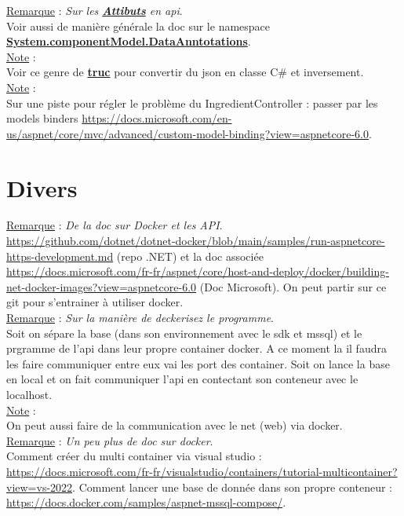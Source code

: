 \documentclass[a4paper,12pt,twoside]{article}
\newcommand{\urlcolor}{magenta}  %
\newcommand{\keycolor}{purple} %
\newcommand{\rem}[2]{\noindent\underline{Remarque} : \textit{#1}.\\ \indent #2}
\newcommand{\note}[1]{\noindent\underline{Note} : \\ \indent #1}
\newcommand{\keyref}[2]{\hypersetup{urlcolor=\keycolor} \href{#1}{\textbf{#2}}\hypersetup{urlcolor=\urlcolor}}
\begin{document}
\rem{Sur les \keyref{https://docs.microsoft.com/fr-fr/dotnet/api/system.componentmodel.dataannotations.metadatatypeattribute?view=net-6.0}{Attibuts} en api}{Voir aussi de manière générale la doc sur le namespace \keyref{https://docs.microsoft.com/fr-fr/dotnet/api/system.componentmodel.dataannotations?view=net-6.0}{System.componentModel.DataAnntotations}.}\\

\note{Voir ce genre de \keyref{https://json2csharp.com/}{truc} pour convertir du json en classe C\# et inversement.}\\

\note{Sur une piste pour régler le problème du IngredientController : passer par les models binders \url{https://docs.microsoft.com/en-us/aspnet/core/mvc/advanced/custom-model-binding?view=aspnetcore-6.0}.}\\

\section{Divers}

\rem{De la doc sur Docker et les API}{\url{https://github.com/dotnet/dotnet-docker/blob/main/samples/run-aspnetcore-https-development.md} (repo .NET) et la doc associée \url{https://docs.microsoft.com/fr-fr/aspnet/core/host-and-deploy/docker/building-net-docker-images?view=aspnetcore-6.0} (Doc Microsoft). On peut partir sur ce git pour s'entrainer à utiliser docker.}\\

\rem{Sur la manière de deckerisez le programme}{Soit on sépare la base (dans son environnement avec le sdk et mssql) et le prgramme de l'api dans leur propre container docker. A ce moment la il faudra les faire communiquer entre eux vai les port des container. Soit on lance la base en local et on fait communiquer l'api en contectant son conteneur avec le localhost.}\\

\note{On peut aussi faire de la communication avec le net (web) via docker.}\\

\rem{Un peu plus de doc sur docker}{Comment créer du multi container via visual studio : \url{https://docs.microsoft.com/fr-fr/visualstudio/containers/tutorial-multicontainer?view=vs-2022}. Comment lancer une base de donnée dans son propre conteneur : \url{https://docs.docker.com/samples/aspnet-mssql-compose/}.}\\
\end{document}
